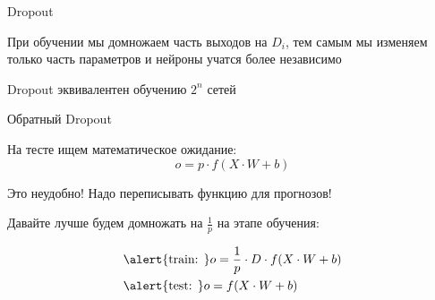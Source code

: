 \documentclass[notes,12pt, aspectratio=169]{beamer}
\newenvironment{wideitemize}{\itemize\addtolength{\itemsep}{10pt}}{\enditemize}
\begin{document}
\begin{frame}{Dropout}
\begin{wideitemize}
\item  При обучении мы домножаем часть выходов на $D_i$, тем самым мы изменяем только часть параметров и нейроны учатся более независимо 

\item  Dropout эквивалентен обучению $2^n$ сетей




\end{wideitemize}
\end{frame}




\begin{frame}{Обратный Dropout}
\begin{wideitemize}
	\item   На тесте ищем математическое ожидание: 
		$$
		o = p \cdot f(X \cdot W + b)
		$$ \pause
		
	\item \alert{Это неудобно! Надо переписывать функцию для прогнозов!}  \pause
	
	\item Давайте лучше будем домножать на $\frac{1}{p}$ на этапе обучения: 
	
	\begin{equation*}
		\begin{aligned}
			& \alert{ \text{train: }}  o = \frac{1}{p} \cdot D \cdot f(X \cdot W + b) \\ 
			& \alert{\text{test:  }}   o = f(X \cdot W + b) \\
		\end{aligned}
	\end{equation*}		
\end{wideitemize}
\end{frame}
\end{document}
